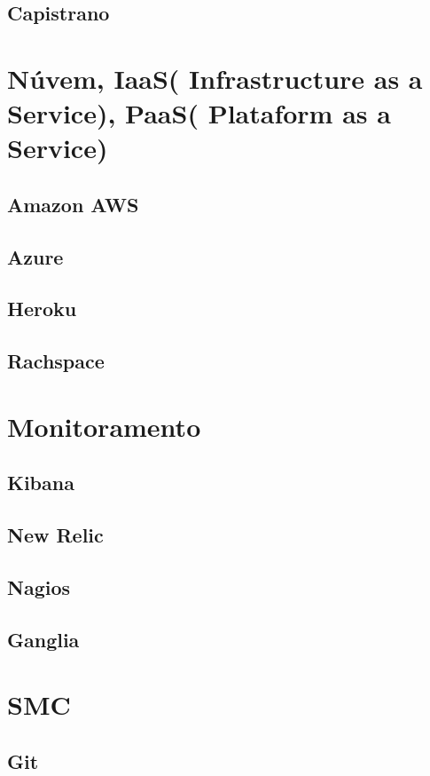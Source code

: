	\subsection{Capistrano}

    \section{Núvem, IaaS( Infrastructure as a Service), PaaS( Plataform as a Service)}

	\subsection{Amazon AWS}
	\subsection{Azure}
	\subsection{Heroku}
	\subsection{Rachspace}

    \section{Monitoramento}

	\subsection{Kibana}
	\subsection{New Relic}
	\subsection{Nagios}
	\subsection{Ganglia}

    \section{SMC}

	\subsection{Git}
